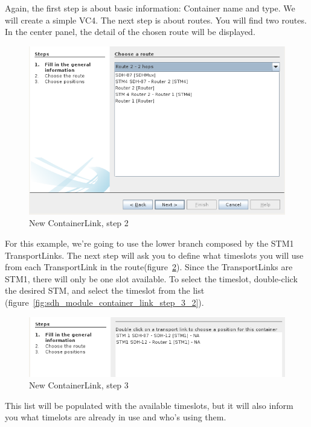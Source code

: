 \documentclass[a4paper]{article}
\begin{document}
		Again, the first step is about basic information: Container name and type. We will create a simple VC4. The next step is about routes. You will find two routes. In the center panel, the detail of the chosen route will be displayed.
		\begin{figure}[h!]
			\centering
			\includegraphics[width=\linewidth]{img/sdh_module_container_link_step_2.png}
			\caption{New ContainerLink, step 2}
			\label{fig:sdh_module_container_link_step_2}
		\end{figure}
		\newpage
		For this example, we're going to use the lower branch composed by the STM1 TransportLinks. The next step will ask you to define what timeslots you will use from each TransportLink in the route(figure~\ref{fig:sdh_module_container_link_step_3}). Since the TransportLinks are STM1, there will only be one slot available. To select the timeslot, double-click the desired STM, and select the timeslot from the list (figure~\ref{fig:sdh_module_container_link_step_3_2}).
		\begin{figure}[h!]
			\centering
			\includegraphics[width=\linewidth]{img/sdh_module_container_link_step_3.png}
			\caption{New ContainerLink, step 3}
			\label{fig:sdh_module_container_link_step_3}
		\end{figure}
		\newpage
		This list will be populated with the available timeslots, but it will also inform you what timelots are already in use and who's using them.
\end{document}
